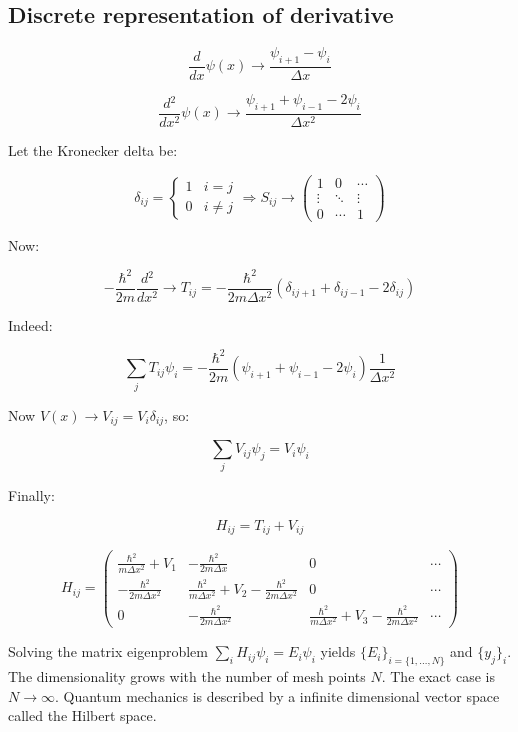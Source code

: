   \subsection{Discrete representation of derivative}

  $$\frac{d{}}{d{x}}\psi(x) \rightarrow \frac{\psi_{i+1}-\psi_i}{\Delta x}$$

  $$\frac{d{^2}}{d{x^2}}\psi(x) \rightarrow \frac{\psi_{i+1}+\psi_{i-1}-2\psi_i}{\Delta x^2}$$

  Let the Kronecker delta be:

      $$\delta_{ij} =\begin{cases}1 &i=j\\0 &i\neq j\end{cases}\Rightarrow S_{ij} \rightarrow\begin{pmatrix}1 & 0 & \cdots\\\vdots & \ddots &\vdots \\0&\cdots & 1 \end{pmatrix}$$

  Now:

  $$-\frac{\hbar^2}{2m}\frac{d{^2}}{d{x^2}}\rightarrow T_{ij}=-\frac{\hbar^2}{2m\Delta x^2}(\delta_{ij+1}+\delta_{ij-1}-2\delta_{ij})$$

  Indeed:

  $$\sum\limits_{j}T_{ij}\psi_i = -\frac{\hbar^2}{2m}(\psi_{i+1}+\psi_{i-1}-2\psi_i)\frac{1}{\Delta x^2}$$

  Now $V(x) \rightarrow V_{ij} = V_i\delta_{ij}$, so:

  $$\sum\limits_{j}V_{ij}\psi_j = V_i\psi_i$$

  Finally:

  $$H_{ij} = T_{ij} + V_{ij}$$

  $$H_{ij} = \begin{pmatrix}\frac{\hbar^2}{m\Delta x^2} + V_1 & -\frac{\hbar^2}{2m\Delta x} & 0 & \cdots\\ -\frac{\hbar^2}{2m\Delta x^2} & \frac{\hbar^2}{m\Delta x^2}+V_2-\frac{\hbar^2}{2m \Delta x^2} & 0 & \cdots\\ 0 & -\frac{\hbar^2}{2m\Delta x^2} & \frac{\hbar^2}{m\Delta x^2}+V_3 - \frac{\hbar^2}{2m\Delta x^2} & \cdots\end{pmatrix}$$

  Solving the  matrix eigenproblem $\sum\limits_i H_{ij}\psi_i = E_i\psi_i$ yields $\{E_i\}_{i=\{1,\dots,N\}}$ and $\{y_j\}_i$.
  The dimensionality grows with the number of mesh points $N$.
  The exact case is $N\rightarrow\infty$.
  Quantum mechanics is described by a infinite dimensional vector space called the Hilbert space.
